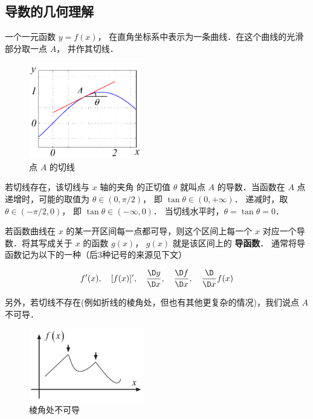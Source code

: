 

\subsection{导数的几何理解}

一个一元函数 $y = f\left( x \right)$， 在直角坐标系中表示为一条曲线．在这个曲线的光滑部分取一点 $A$， 并作其切线．

\begin{figure}[h]
\centering
\includegraphics[width=5cm]{./figures/Der1.pdf}
\caption{点 $A$ 的切线}
\end{figure}


若切线存在，该切线与 $x$ 轴的夹角 的正切值 $\theta$ 就叫点 $A$ 的导数．当函数在 $A$ 点递增时，可能的取值为 $\theta  \in \left( {0,\pi/2} \right)$， 即 $\tan \theta  \in \left( {0, + \infty } \right)$． 递减时，取 $\theta  \in (-\pi/2,0)$， 即 $\tan \theta  \in (-\infty ,0)$． 当切线水平时，$\theta  = \tan \theta  = 0$． 

若函数曲线在 $x$ 的某一开区间每一点都可导，则这个区间上每一个 $x$ 对应一个导数．将其写成关于 $x$ 的函数 $g\left( x \right)$，  $g\left( x \right)$  就是该区间上的 \textbf{导函数}． 通常将导函数记为以下的一种（后3种记号的来源见下文）

\begin{equation}\label{Der_eq1}
f'(x),\quad [f(x)]',\quad \frac{\D y}{\D x},\quad \frac{\D f}{\D x},\quad\frac{\D}{\D x}f(x)
\end{equation}


另外，若切线不存在(例如折线的棱角处，但也有其他更复杂的情况)，我们说点 $A$ 不可导．

\begin{figure}[h]
\centering
\includegraphics[width=5cm]{./figures/Der3.pdf}
\caption{棱角处不可导}
\end{figure}


